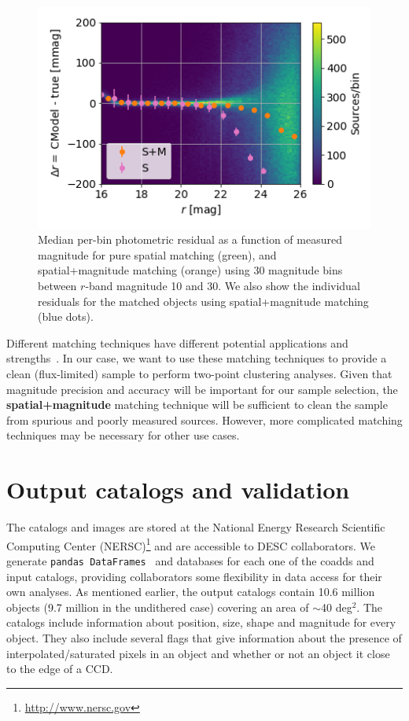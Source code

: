 \documentclass[\docopts]{\docclass}
\begin{document}
\begin{figure}
\centering
\includegraphics[width=0.85\columnwidth]{photometry_residual_comparison}
\caption{Median per-bin photometric residual as a function of measured magnitude for pure spatial matching (green), and spatial+magnitude matching (orange) using 30 magnitude bins between $r$-band magnitude 10 and 30. We also show the individual residuals for the matched objects using spatial+magnitude matching (blue dots).}
\label{fig:matching_comparison}
\end{figure}

Different matching techniques have different potential applications and strengths~\citep{doi:10.1146/annurev-statistics-010814-020231}. In our case, we want to use these matching techniques to provide a clean (flux-limited) sample to perform two-point clustering analyses. Given that magnitude precision and accuracy will be important for our sample selection, the \textbf{spatial+magnitude} matching technique will be sufficient to clean the sample from spurious and poorly measured sources. However, more complicated matching techniques may be necessary for other use cases.
 
 
\section{Output catalogs and validation}
\label{sec:catalogs}
The catalogs and images are stored at the National Energy Research Scientific Computing Center (NERSC)\footnote{\url{http://www.nersc.gov}} and are accessible to DESC collaborators. We generate \texttt{pandas
DataFrames}~\citep{mckinney-proc-scipy-2010} and databases for each one of the coadds and input catalogs, providing collaborators some flexibility in data access for their own analyses. As mentioned earlier, the output catalogs contain 10.6 million objects (9.7 million in the undithered case) covering an area
of $\sim$40 deg$^{2}$. The catalogs include information about position, size, shape and magnitude for every object. They also include several flags that give information about the presence of interpolated/saturated pixels in an object and whether or not an object it close to the edge of a CCD.
\end{document}
